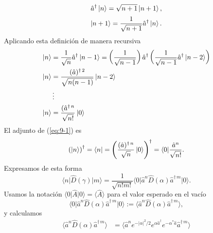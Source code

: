 \begin{enumerate}
        \begin{equation}
          \hat{a}^{\dagger}\ket{n} = \sqrt{n+1}\ket{n+1},
        \end{equation}
        \begin{equation}
          \ket{n+1} = \frac{1}{\sqrt{n+1}}\hat{a}^{\dagger}\ket{n}.
        \end{equation}
        Aplicando esta definición de manera recursiva
        \begin{align}
          \ket{n} & = \frac{1}{\sqrt{n}}\hat{a}^{\dagger}\ket{n-1} = \left( \frac{1}{\sqrt{n-1}} \right)\hat{a}^{\dagger}\left( \frac{1}{\sqrt{n-1}} \hat{a}^{\dagger} \ket{n-2} \right) \nonumber \\
          \ket{n} & = \frac{(\hat{a})^{\dagger\,2}}{\sqrt{n(n-1)}}\ket{n-2} \nonumber                                                                                                              \\
                  & \vdots \nonumber                                                                                                                                                               \\
          \ket{n} & = \frac{(\hat{a}^{\dagger\,n}}{\sqrt{n!}}\ket{0} \label{eq:9-1}
        \end{align}
        El adjunto de (\ref{eq:9-1}) es
        \begin{equation}
          \left( \ket{n} \right)^{\dagger} = \langle n | = \left( \frac{(\hat{a})^{\dagger\,n}}{\sqrt{n}}\ket{0} \right)^\dagger = \langle 0 | \frac{\hat{a}^n}{\sqrt{n!}}.\label{eq:9-2}
        \end{equation}
        Expresamos de esta forma
        \begin{equation}
          \langle n \vert \hat{D}(\gamma) \vert m \rangle = \frac{1}{\sqrt{n!m!}} \langle 0 \vert  \hat{a}^{n} \hat{D}(\alpha)\hat{a}^{\dagger\,m}\vert 0 \rangle. \label{eq:9-4}
        \end{equation}
        Usamos la notación $\langle 0 \vert \hat{A} \vert 0 \rangle = \langle \hat{A} \rangle$ para el valor esperado en el vacío
        \begin{equation}
          \langle 0 \vert \hat{a}^{n} \hat{D}(\alpha) \hat{a}^{\dagger\,m} \vert 0\rangle := \langle \hat{a}^{n} \hat{D}(\alpha) \hat{a}^{\dagger\,m} \rangle,
        \end{equation}
        y calculamos
        \begin{align}
          \langle \hat{a}^{n} \hat{D}(\alpha) \hat{a}^{\dagger\,m} \rangle & = \langle \hat{a}^{n}  e^{-|\alpha|^2/2} e^{\alpha \hat{a}^{\dagger}}e^{-\alpha^{*}\hat{a}} \hat{a}^{\dagger\,m} \rangle                                                       \nonumber \\

\end{align}
\end{enumerate}
